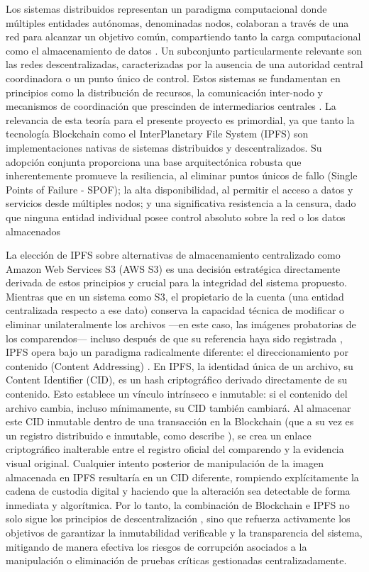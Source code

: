 \documentclass[
    letterpaper, 
    man,   
    spanish,
    12pt,
    donotrepeattitle,
    floatsintext,
    hidelinks %
]{apa7}
\begin{document}
Los sistemas distribuidos representan un paradigma computacional donde múltiples entidades autónomas, denominadas nodos, colaboran a través de una red para alcanzar un objetivo común, compartiendo tanto la carga computacional como el almacenamiento de datos \parencite{vanSteen2017}.
Un subconjunto particularmente relevante son las redes descentralizadas, caracterizadas por la ausencia de una autoridad central coordinadora o un punto único de control. Estos sistemas se fundamentan en principios como la distribución de recursos, la comunicación inter-nodo y mecanismos de coordinación que prescinden de intermediarios centrales \parencite{coulouris2011}.
La relevancia de esta teoría para el presente proyecto es primordial, ya que tanto la tecnología Blockchain \parencite{nakamoto2008bitcoin} como el InterPlanetary File System (IPFS) \parencite{benet2014ipfs} son implementaciones nativas de sistemas distribuidos y descentralizados.
Su adopción conjunta proporciona una base arquitectónica robusta que inherentemente promueve la resiliencia, al eliminar puntos únicos de fallo (Single Points of Failure - SPOF); la alta disponibilidad, al permitir el acceso a datos y servicios desde múltiples nodos; y una significativa resistencia a la censura, dado que ninguna entidad individual posee control absoluto sobre la red o los datos almacenados \parencite{antonopoulos2023mastering} 

La elección de IPFS sobre alternativas de almacenamiento centralizado como Amazon Web Services S3 (AWS S3) es una decisión estratégica directamente derivada de estos principios y crucial para la integridad del sistema propuesto.
Mientras que en un sistema como S3, el propietario de la cuenta (una entidad centralizada respecto a ese dato) conserva la capacidad técnica de modificar o eliminar unilateralmente los archivos —en este caso, las imágenes probatorias de los comparendos— incluso después de que su referencia haya sido registrada \parencite{vogels2008eventually}, IPFS opera bajo un paradigma radicalmente diferente: el direccionamiento por contenido (Content Addressing) \parencite{benet2014ipfs}. En IPFS, la identidad única de un archivo, su Content Identifier (CID), es un hash criptográfico derivado directamente de su contenido.
Esto establece un vínculo intrínseco e inmutable: si el contenido del archivo cambia, incluso mínimamente, su CID también cambiará. Al almacenar este CID inmutable dentro de una transacción en la Blockchain (que a su vez es un registro distribuido e inmutable, como describe \parencite{nakamoto2008bitcoin}), se crea un enlace criptográfico inalterable entre el registro oficial del comparendo y la evidencia visual original.
Cualquier intento posterior de manipulación de la imagen almacenada en IPFS resultaría en un CID diferente, rompiendo explícitamente la cadena de custodia digital y haciendo que la alteración sea detectable de forma inmediata y algorítmica. Por lo tanto, la combinación de Blockchain e IPFS no solo sigue los principios de descentralización \parencite{vanSteen2017}, sino que refuerza activamente los objetivos de garantizar la inmutabilidad verificable y la transparencia del sistema, mitigando de manera efectiva los riesgos de corrupción asociados a la manipulación o eliminación de pruebas críticas gestionadas centralizadamente. 
\end{document}
